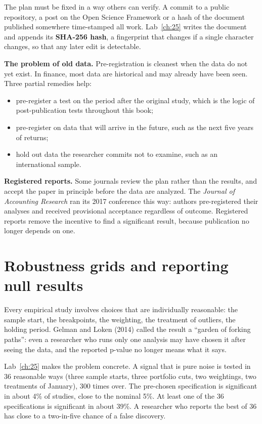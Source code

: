 The plan must be fixed in a way others can verify. A commit to a public repository, a post on the Open Science Framework or a hash of the document published somewhere time-stamped all work. Lab~\ref{ch:25} writes the document and appends its \textbf{SHA-256 hash}, a fingerprint that changes if a single character changes, so that any later edit is detectable.

\textbf{The problem of old data.} Pre-registration is cleanest when the data do not yet exist. In finance, most data are historical and may already have been seen. Three partial remedies help:

\begin{itemize}
  \item pre-register a test on the period after the original study, which is the logic of post-publication tests throughout this book;
  \item pre-register on data that will arrive in the future, such as the next five years of returns;
  \item hold out data the researcher commits not to examine, such as an international sample.
\end{itemize}

\textbf{Registered reports.} Some journals review the plan rather than the results, and accept the paper in principle before the data are analyzed. The \emph{Journal of Accounting Research} ran its 2017 conference this way: authors pre-registered their analyses and received provisional acceptance regardless of outcome. Registered reports remove the incentive to find a significant result, because publication no longer depends on one.

\section{Robustness grids and reporting null results}
\label{sec:25-robust}

Every empirical study involves choices that are individually reasonable: the sample start, the breakpoints, the weighting, the treatment of outliers, the holding period. Gelman and Loken (2014) called the result a ``garden of forking paths'': even a researcher who runs only one analysis may have chosen it after seeing the data, and the reported p-value no longer means what it says.

Lab~\ref{ch:25} makes the problem concrete. A signal that is pure noise is tested in 36 reasonable ways (three sample starts, three portfolio cuts, two weightings, two treatments of January), 300 times over. The pre-chosen specification is significant in about 4\% of studies, close to the nominal 5\%. At least one of the 36 specifications is significant in about 39\%. A researcher who reports the best of 36 has close to a two-in-five chance of a false discovery.

